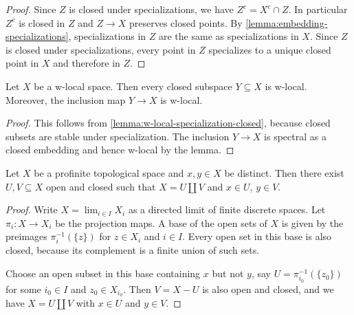\begin{proof}
    \leanok
    Since $Z$ is closed under specializations, we have $Z^c = X^c \cap Z$. In particular
    $Z^c$ is closed in $Z$ and $Z \to X$ preserves closed points.
    By \ref{lemma:embedding-specializations}, specializations
    in $Z$ are the same as specializations in $X$. Since $Z$ is closed
    under specializations, every point in $Z$ specializes to a unique
    closed point in $X$ and therefore in $Z$.
\end{proof}

\begin{lemma}
    \label{thm:closed-subspace-w-local}
    Let \(X\) be a w-local space. Then every closed subspace \(Y \subseteq X\) is w-local.
    Moreover, the inclusion map \(Y \to X\) is w-local.
    \leanok
\end{lemma}

\begin{proof}
    \leanok
    This follows from \ref{lemma:w-local-specialization-closed}, because
    closed subsets are stable under specialization. The inclusion $Y \to X$ is
    spectral as a closed embedding and hence w-local by the lemma.
\end{proof}

\begin{lemma}
    Let $X$ be a profinite topological space and $x, y \in X$ be distinct. Then
    there exist $U, V \subseteq X$ open and closed such that $X = U \coprod V$ and
    $x \in U$, $y \in V$.
    \label{lemma:profinite-disj-clopen-separation}
    \mathlibok
\end{lemma}

\begin{proof}
  \mathlibok
  Write $X = \lim_{i \in I} X_i$ as a directed limit of finite discrete spaces. Let $\pi_i \colon X \to X_i$ be the
  projection maps. A base of the open sets of $X$ is given by the preimages $\pi_i^{-1}(\{z\})$ for $z \in X_i$ and $i \in I$. Every open set in this base is also closed, because its complement is a finite union of such sets.

  Choose an open subset in this base containing $x$ but not $y$, say $U = \pi_{i_0}^{-1}(\{z_0\})$ for some $i_0 \in I$ and $z_0 \in X_{i_0}$. Then $V = X - U$ is also open and closed, and we have $X = U \coprod V$ with $x \in U$ and $y \in V$.   
\end{proof}

